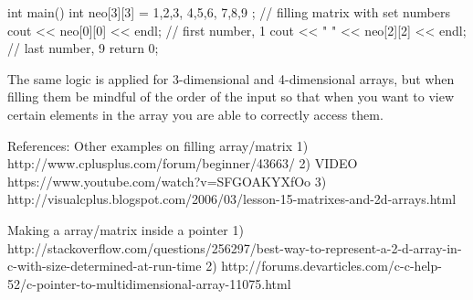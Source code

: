 {int main()
{
    int neo[3][3] = { {1,2,3}, {4,5,6}, {7,8,9} }; // filling matrix with set numbers
    cout << neo[0][0] << endl; // first number, 1
    cout << "  " << neo[2][2] << endl; // last number, 9
    return 0;
}

	The same logic is applied for 3-dimensional and 4-dimensional arrays, but when filling them be mindful of the order of the input so that when you want to view certain elements in the array you are able to correctly access them.


References: 
Other examples on filling array/matrix
1) http://www.cplusplus.com/forum/beginner/43663/
2) VIDEO https://www.youtube.com/watch?v=SFGOAKYXfOo
3) http://visualcplus.blogspot.com/2006/03/lesson-15-matrixes-and-2d-arrays.html

Making a array/matrix inside a pointer
1) http://stackoverflow.com/questions/256297/best-way-to-represent-a-2-d-array-in-c-with-size-determined-at-run-time
2) http://forums.devarticles.com/c-c-help-52/c-pointer-to-multidimensional-array-11075.html

}